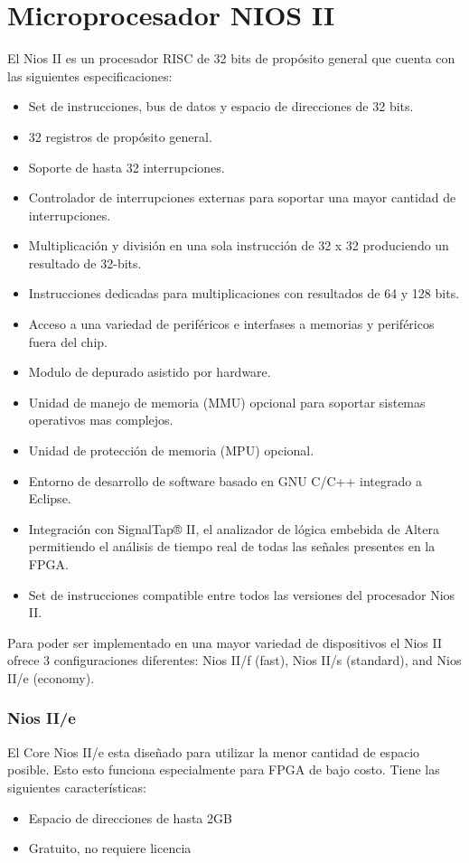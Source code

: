 \section{Microprocesador NIOS II}
El Nios II es un procesador RISC de 32 bits de propósito general que cuenta con las siguientes especificaciones:
\begin{itemize}
	\item Set de instrucciones, bus de datos y espacio de direcciones de 32 bits.
	\item 32 registros de propósito general.
	\item Soporte de hasta 32 interrupciones.
	\item Controlador de interrupciones externas para soportar una mayor cantidad de interrupciones.
	\item Multiplicación y división en una sola instrucción de 32 x 32 produciendo un resultado de 32-bits.
	\item Instrucciones dedicadas para multiplicaciones con resultados de 64 y 128 bits.
	\item Acceso a una variedad de periféricos e interfases a memorias  y periféricos fuera del chip.
	\item Modulo de depurado asistido por hardware.
	\item Unidad de manejo de memoria (MMU) opcional para soportar sistemas operativos mas complejos.
	\item Unidad de protección de memoria (MPU) opcional.
	\item Entorno de desarrollo de software basado en GNU C/C++ integrado a Eclipse.
	\item Integración con SignalTap® II, el analizador de lógica embebida de Altera permitiendo el análisis de tiempo real de todas las señales presentes en la FPGA.
	\item Set de instrucciones compatible entre todos las versiones del procesador Nios II.
\end{itemize}

Para poder ser implementado en una mayor variedad de dispositivos el Nios II ofrece 3 configuraciones diferentes:  Nios II/f (fast), Nios II/s (standard), and Nios II/e (economy).

\subsubsection{Nios II/e}
El Core Nios II/e esta diseñado para utilizar la menor cantidad de espacio posible. Esto esto funciona especialmente para FPGA de bajo costo. Tiene las siguientes características:
\begin{itemize}
	\item Espacio de direcciones de hasta 2GB
	\item Gratuito, no requiere licencia 
\end{itemize}

